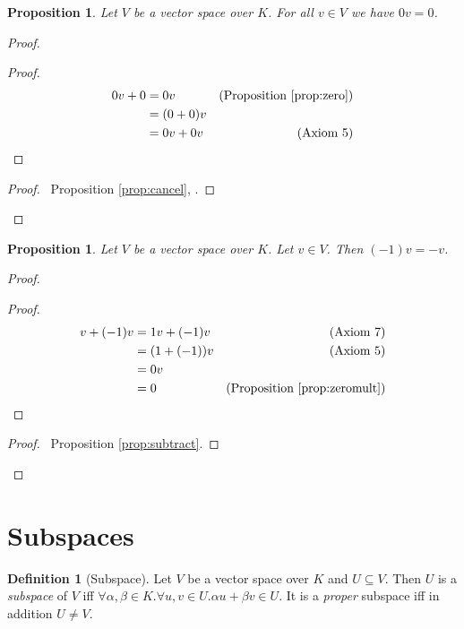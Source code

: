 \documentclass{book}
\let\qed\relax
\newtheorem{prop}[ax]{Proposition}
\theoremstyle{definition}
\newtheorem{df}[ax]{Definition}
\begin{document}
\begin{prop}
\label{prop:zeromult}
Let $V$ be a vector space over $K$. For all $v \in V$ we have $0v = 0$.
\end{prop}

\begin{proof}
\pf
{}
\begin{proof}
	\begin{align*}
	0v + 0 & = 0v & (\text{Proposition \ref{prop:zero}}) \\
	& = (0+0)v \\
	& = 0v + 0v & (\text{Axiom 5})
\end{align*}
\end{proof}
\begin{proof}
	\pf\ Proposition \ref{prop:cancel}, .
\end{proof}
\qed
\end{proof}

\begin{prop}
Let $V$ be a vector space over $K$. Let $v \in V$. Then $(-1)v = -v$.
\end{prop}

\begin{proof}
\pf
{}
\begin{proof}
	\pf
	\begin{align*}
		v + (-1)v & = 1v + (-1)v & (\text{Axiom 7}) \\
		& = (1 + (-1))v & (\text{Axiom 5}) \\
		& = 0v \\
		& = 0 & (\text{Proposition \ref{prop:zeromult}})
	\end{align*}
\end{proof}
\qedstep
\begin{proof}
	\pf\ Proposition \ref{prop:subtract}.
\end{proof}
\qed
\end{proof}

\section{Subspaces}

\begin{df}[Subspace]
Let $V$ be a vector space over $K$ and $U \subseteq V$. Then $U$ is a \emph{subspace} of $V$ iff $\forall \alpha, \beta \in K. \forall u,v \in U. \alpha u + \beta v \in U$. It is a \emph{proper} subspace iff in addition $U \neq V$.
\end{df}
\end{document}
